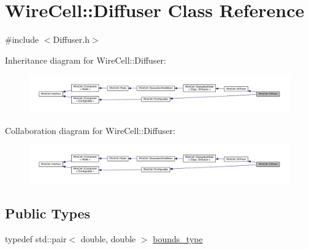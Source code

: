 \hypertarget{class_wire_cell_1_1_diffuser}{}\section{Wire\+Cell\+:\+:Diffuser Class Reference}
\label{class_wire_cell_1_1_diffuser}


{\ttfamily \#include $<$Diffuser.\+h$>$}



Inheritance diagram for Wire\+Cell\+:\+:Diffuser\+:
\nopagebreak
\begin{figure}[H]
\begin{center}
\leavevmode
\includegraphics[width=350pt]{class_wire_cell_1_1_diffuser__inherit__graph}
\end{center}
\end{figure}


Collaboration diagram for Wire\+Cell\+:\+:Diffuser\+:
\nopagebreak
\begin{figure}[H]
\begin{center}
\leavevmode
\includegraphics[width=350pt]{class_wire_cell_1_1_diffuser__coll__graph}
\end{center}
\end{figure}
\subsection*{Public Types}
\begin{DoxyCompactItemize}
\item 
typedef std\+::pair$<$ double, double $>$ \hyperlink{class_wire_cell_1_1_diffuser_a5ec949c1c222b25d1db6542dacc6d983}{bounds\+\_\+type}
\end{DoxyCompactItemize}
